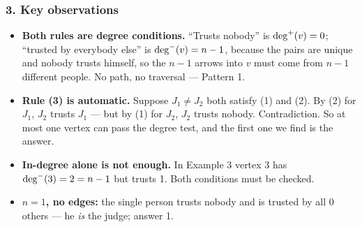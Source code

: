 \begin{diagrambox}
\end{diagrambox}

\subsubsection*{3. Key observations}

\begin{itemize}[leftmargin=*]
    \item \textbf{Both rules are degree conditions.} ``Trusts nobody'' is $\deg^{+}(v) = 0$; ``trusted by everybody else'' is $\deg^{-}(v) = n-1$, because the pairs are unique and nobody trusts himself, so the $n-1$ arrows into $v$ must come from $n-1$ different people. No path, no traversal --- Pattern 1.
    \item \textbf{Rule (3) is automatic.} Suppose $J_1 \ne J_2$ both satisfy (1) and (2). By (2) for $J_1$, $J_2$ trusts $J_1$ --- but by (1) for $J_2$, $J_2$ trusts nobody. Contradiction. So at most one vertex can pass the degree test, and the first one we find is the answer.
    \item \textbf{In-degree alone is not enough.} In Example 3 vertex 3 has $\deg^{-}(3) = 2 = n-1$ but trusts 1. Both conditions must be checked.
    \item \textbf{$n = 1$, no edges:} the single person trusts nobody and is trusted by all $0$ others --- he \emph{is} the judge; answer 1.
\end{itemize}

